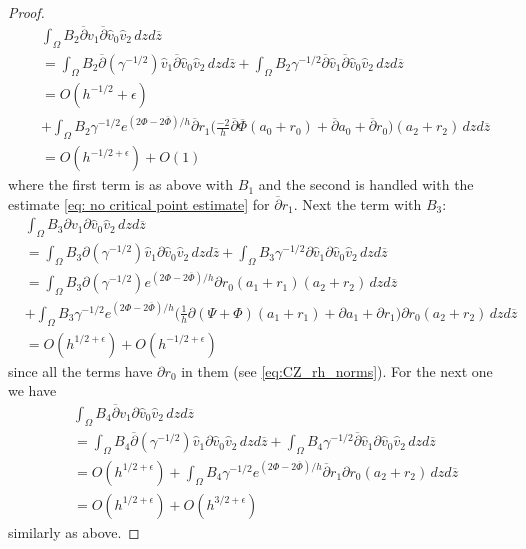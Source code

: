 \documentclass[a4paper, 10pt, twoside, notitlepage]{amsart}
\theoremstyle{plain}
\newcommand{\Om}{\Omega}
\numberwithin{equation}{section}
\newcommand {\p} {\partial}
\newcommand{\e}{\epsilon}
\newcommand{\dbar}{\ol{\p}}
\newcommand{\ol}[1]{\overline{#1}}
\newcommand{\oz}{\overline{z}}
\begin{document}
\begin{proof}
\begin{align*}
		&\int_{\Om}B_2\dbar v_1\dbar \hat{v}_0\hat{v}_2 \,dzd\oz\\
		&= \int_{\Om}B_2\dbar(\gamma^{-1/2})\hat{v}_1\dbar \hat{v}_0\hat{v}_2\,dzd\oz + \int_{\Om} B_2\gamma^{-1/2}\dbar \hat{v}_1\dbar \hat{v}_0 \hat{v}_2\,dzd\oz\\
		&= O(h^{-1/2}+\e)\\
		&+ \int_{\Om} B_2\gamma^{-1/2}e^{(2\Phi - 2\ol{\Phi})/h}\dbar r_1\Big(\frac{-2}{h}\dbar\ol{\Phi}(a_0+r_0) + \dbar a_0 + \dbar r_0\Big)(a_2 + r_2)\,dzd\oz\\
		&= O(h^{-1/2+\e}) + O(1)
	\end{align*}
	where the first term is as above with $B_1$ and the second is handled with the estimate \eqref{eq: no critical point estimate} for $\dbar r_1$. Next the term with $B_3$:
	\begin{align*}
		&\int_{\Om}B_3 \p v_1 \p \hat{v}_0\hat{v}_2\,dzd\oz\\
		&= \int_{\Om}B_3\p(\gamma^{-1/2})\hat{v}_1\p \hat{v}_0\hat{v}_2\,dzd\oz + \int_{\Om} B_3\gamma^{-1/2}\p \hat{v}_1\p \hat{v}_0 \hat{v}_2\,dzd\oz\\
		&= \int_{\Om}B_3\p(\gamma^{-1/2})e^{(2\Phi - 2\ol{\Phi})/h}\p r_0(a_1+r_1)(a_2+r_2)\,dzd\oz\\
		&+ \int_{\Om} B_3\gamma^{-1/2}e^{(2\Phi - 2\ol{\Phi})/h}\Big(\frac{1}{h}\p(\Psi + \Phi)(a_1 + r_1) + \p a_1 + \p r_1\Big)\p r_0(a_2 + r_2)\,dzd\oz\\
		&= O(h^{1/2+\e}) + O(h^{-1/2+\e})
	\end{align*}
	since all the terms have $\p r_0$ in them (see \eqref{eq:CZ_rh_norms}).
	For the next one we have
	\begin{align*}
		&\int_{\Om}B_4 \dbar v_1 \p \hat{v}_0\hat{v}_2\,dzd\oz\\
		&= \int_{\Om}B_4\dbar(\gamma^{-1/2})\hat{v}_1\p \hat{v}_0\hat{v}_2\,dzd\oz + \int_{\Om} B_4\gamma^{-1/2}\dbar \hat{v}_1\p \hat{v}_0 \hat{v}_2\,dzd\oz\\
		&= O(h^{1/2+\e}) + \int_{\Om} B_4\gamma^{-1/2}e^{(2\Phi - 2\ol{\Phi})/h}\dbar r_1\p r_0(a_2+r_2)\,dzd\oz\\
		&= O(h^{1/2+\e}) + O(h^{3/2+\e})
	\end{align*}
	similarly as above.
	

\end{proof}
\end{document}
